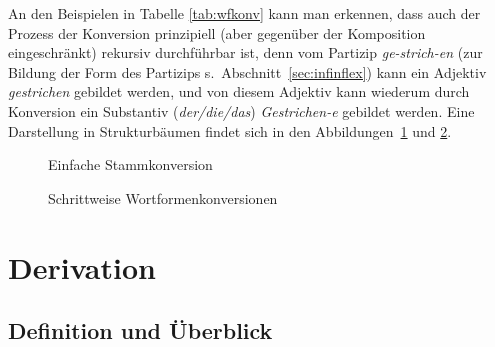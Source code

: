 An den Beispielen in Tabelle \ref{tab:wfkonv} kann man erkennen, dass auch der Prozess der Konversion prinzipiell (aber gegenüber der Komposition eingeschränkt) rekursiv durchführbar ist, denn vom Partizip \textit{ge-strich-en} (zur Bildung der Form des Partizips s.\ Abschnitt~\ref{sec:infinflex}) kann ein Adjektiv \textit{gestrichen} gebildet werden, und von diesem Adjektiv kann wiederum durch Konversion ein Substantiv (\textit{der\slash die\slash das}) \textit{Gestrichen-e} gebildet werden.
Eine Darstellung in Strukturbäumen findet sich in den Abbildungen~\ref{fig:konv1} und \ref{fig:konv2}.

\begin{figure}[!htbp]
  \centering
  \caption{Einfache Stammkonversion}
  \label{fig:konv1}
\end{figure}

\begin{figure}[!htbp]
  \centering
  \caption{Schrittweise Wortformenkonversionen}
  \label{fig:konv2}
\end{figure}





\section{Derivation}

\label{sec:deriv}

\subsection{Definition und Überblick}


